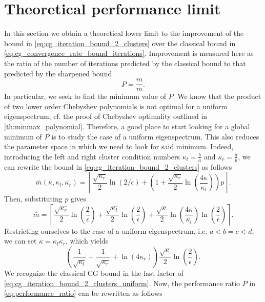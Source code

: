 \section{Theoretical performance limit}\label{sec:cg_sharpened_convrate_th_performance}
In this section we obtain a theoretical lower limit to the improvement of the bound in \cref{eq:cg_iteration_bound_2_clusters} over the classical bound in \cref{eq:cg_convergence_rate_bound_iterations}. Improvement is measured here as the ratio of the number of iterations predicted by the classical bound to that predicted by the sharpened bound
\begin{equation}
    P = \frac{m}{\bar{m}}.
    \label{eq:performance_ratio}
\end{equation}
In particular, we seek to find the minimum value of $P$. We know that the product of two lower order Chebyshev polynomials is not optimal for a uniform eigenspectrum, cf. the proof of Chebyshev optimality outlined in \cref{th:minmax_polynomial}. Therefore, a good place to start looking for a global minimum of $P$ is to study the case of a uniform eigenspectrum. This also reduces the parameter space in which we need to look for said minimum. Indeed, introducing the left and right cluster condition numbers $\kappa_l = \frac{b}{a}$ and $\kappa_r = \frac{d}{b}$, we can rewrite the bound in \cref{eq:cg_iteration_bound_2_clusters} as follows
\[
        \bar{m}(\kappa, \kappa_l, \kappa_r)=\left\lceil\frac{\sqrt{\kappa_r}}{2} \ln (2 / \epsilon)+\left(1+\frac{\sqrt{\kappa_r}}{2} \ln \left(\frac{4\kappa}{\kappa_l}\right)\right) p\right\rceil.
\]
Then, substituting $p$ gives
\begin{equation}
    \bar{m}=\left\lceil \frac{\sqrt{\kappa_r}}{2}\ln\left(\frac{2}{\epsilon}\right) + \frac{\sqrt{\kappa_l}}{2}\ln\left(\frac{2}{\epsilon}\right) + \frac{\sqrt{\kappa}}{2}\ln\left(\frac{4\kappa}{\kappa_l}\right)\ln\left(\frac{2}{\epsilon}\right) \right\rceil.
\end{equation}  
Restricting ourselves to the case of a uniform eigenspectrum, i.e. $a<b=c<d$, we can set $\kappa=\kappa_l\kappa_r$, which yields
\begin{equation}
    \left(\frac{1}{\sqrt{\kappa_l}} + \frac{1}{\sqrt{\kappa_r}} + \ln(4\kappa_r)\right)\frac{\sqrt{\kappa}}{2}\ln\left(\frac{2}{\epsilon}\right).
    \label{eq:cg_iteration_bound_2_clusters_uniform}
\end{equation}
We recognize the classical CG bound in the last factor of \cref{eq:cg_iteration_bound_2_clusters_uniform}. Now, the performance ratio $P$ in \cref{eq:performance_ratio} can be rewritten as follows
